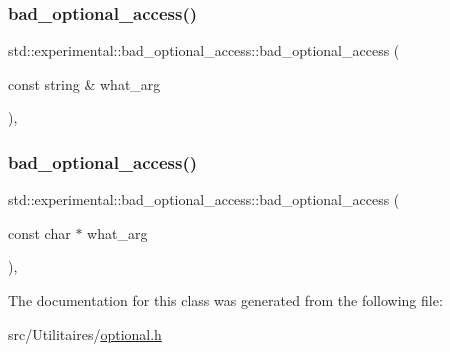 \subsubsection{\texorpdfstring{bad\+\_\+optional\+\_\+access()}{bad\_optional\_access()}\hspace{0.1cm}{\footnotesize\ttfamily [1/2]}}
{\footnotesize\ttfamily std\+::experimental\+::bad\+\_\+optional\+\_\+access\+::bad\+\_\+optional\+\_\+access (\begin{DoxyParamCaption}\item[{const string \&}]{what\+\_\+arg }\end{DoxyParamCaption})\hspace{0.3cm}{\ttfamily [inline]}, {\ttfamily [explicit]}}

\mbox{\label{classstd_1_1experimental_1_1bad__optional__access_a75d7625c06d41839667c6cc9ce144bd1}} 
\subsubsection{\texorpdfstring{bad\+\_\+optional\+\_\+access()}{bad\_optional\_access()}\hspace{0.1cm}{\footnotesize\ttfamily [2/2]}}
{\footnotesize\ttfamily std\+::experimental\+::bad\+\_\+optional\+\_\+access\+::bad\+\_\+optional\+\_\+access (\begin{DoxyParamCaption}\item[{const char $\ast$}]{what\+\_\+arg }\end{DoxyParamCaption})\hspace{0.3cm}{\ttfamily [inline]}, {\ttfamily [explicit]}}



The documentation for this class was generated from the following file\+:\begin{DoxyCompactItemize}
\item 
src/\+Utilitaires/\mbox{\hyperlink{optional_8h}{optional.\+h}}\end{DoxyCompactItemize}
